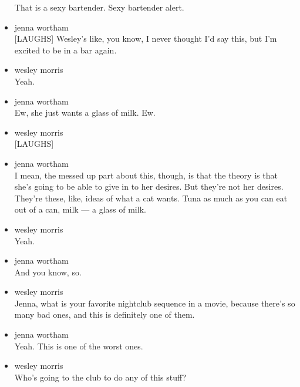 \begin{itemize}
  That is a sexy bartender. Sexy bartender alert.
\item
  jenna wortham\\
  {[}LAUGHS{]} Wesley's like, you know, I never thought I'd say this,
  but I'm excited to be in a bar again.
\item
  wesley morris\\
  Yeah.
\item
  jenna wortham\\
  Ew, she just wants a glass of milk. Ew.
\item
  wesley morris\\
  {[}LAUGHS{]}
\item
  jenna wortham\\
  I mean, the messed up part about this, though, is that the theory is
  that she's going to be able to give in to her desires. But they're not
  her desires. They're these, like, ideas of what a cat wants. Tuna as
  much as you can eat out of a can, milk --- a glass of milk.
\item
  wesley morris\\
  Yeah.
\item
  jenna wortham\\
  And you know, so.
\item
  wesley morris\\
  Jenna, what is your favorite nightclub sequence in a movie, because
  there's so many bad ones, and this is definitely one of them.
\item
  jenna wortham\\
  Yeah. This is one of the worst ones.
\item
  wesley morris\\
  Who's going to the club to do any of this stuff?


\end{itemize}
